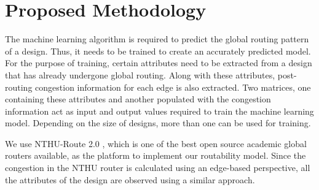 \section{Proposed Methodology}
The machine learning algorithm is required to predict the global routing pattern of a design. Thus, it needs to be trained to create an accurately predicted model. For the purpose of training, certain attributes need to be extracted from a design that has already undergone global routing. Along with these attributes, post-routing congestion information for each edge is also extracted. Two matrices, one containing these attributes and another populated with the congestion information act as input and output values required to train the machine learning model. Depending on the size of designs, more than one can be used for training.

We use NTHU-Route 2.0 \cite{NTHU}, which is one of the best open source academic global routers available, as the platform to implement our routability model. Since the congestion in the NTHU router is calculated using an edge-based perspective, all the attributes of the design are observed using a similar approach. 

